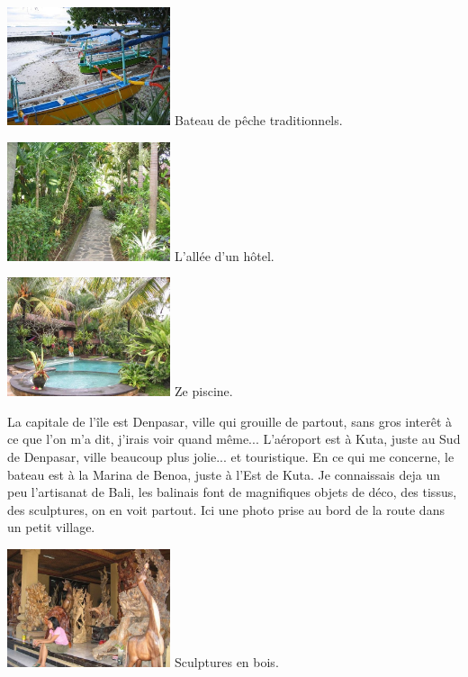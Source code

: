 \begin{multicols}{2}
\hspace*{-0.65cm}
\includegraphics[width=4.8cm]{articles/Arrivee-sur-bali/1207567564x5vI.jpg}
Bateau de pêche traditionnels.

\hspace*{-0.65cm}
\includegraphics[width=4.8cm]{articles/Arrivee-sur-bali/120756756426sq.jpg}
L'allée d'un hôtel.

\hspace*{-0.65cm}
\includegraphics[width=4.8cm]{articles/Arrivee-sur-bali/1207567563njCA.jpg}
Ze piscine.

La capitale de l'île est Denpasar, ville qui grouille de partout, sans gros interêt à ce que l'on m'a dit, j'irais voir quand même... L'aéroport est à Kuta, juste au Sud de Denpasar, ville beaucoup plus jolie... et touristique. En ce qui me concerne, le bateau est à la Marina de Benoa, juste à l'Est de Kuta. Je connaissais deja un peu l'artisanat de Bali, les balinais font de magnifiques objets de déco, des tissus, des sculptures, on en voit partout. Ici une photo prise au bord de la route dans un petit village.

\hspace*{-0.65cm}
\includegraphics[width=4.8cm]{articles/Arrivee-sur-bali/1207567562ISpn.jpg}
Sculptures en bois.


\end{multicols}
